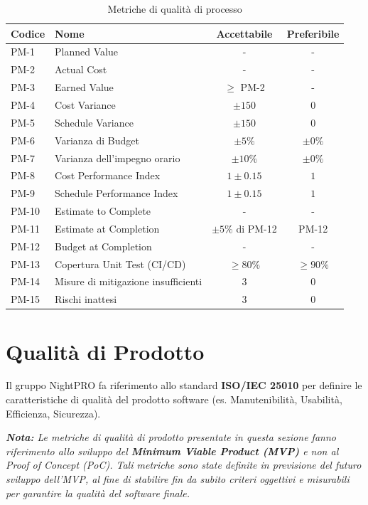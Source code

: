 \documentclass[a4paper,11pt,oneside]{scrartcl}
\begin{document}
\begin{table}[H]
\centering
\renewcommand{\arraystretch}{1.3}
\begin{tabularx}{\textwidth}{@{}p{}Xcc@{}}
\toprule
\textbf{Codice} & \textbf{Nome} & \textbf{Accettabile} & \textbf{Preferibile} \\
\midrule
PM-1 & Planned Value & - & - \\
PM-2 & Actual Cost & - & - \\
PM-3 & Earned Value & $\geq$ PM-2 & - \\
PM-4 & Cost Variance & $\pm 150$ & $0$ \\
PM-5 & Schedule Variance & $\pm 150$ & $0$ \\
PM-6 & Varianza di Budget & $\pm 5\%$ & $\pm 0\%$ \\
PM-7 & Varianza dell'impegno orario & $\pm 10\%$ & $\pm 0\%$ \\
PM-8 & Cost Performance Index & $1 \pm 0.15$ & $1$ \\
PM-9 & Schedule Performance Index & $1 \pm 0.15$ & $1$ \\
PM-10 & Estimate to Complete & - & - \\
PM-11 & Estimate at Completion & $\pm 5\%$ di PM-12 & PM-12 \\
PM-12 & Budget at Completion & - & - \\
PM-13 & Copertura Unit Test (CI/CD) & $\ge 80\%$ & $\ge 90\%$ \\
PM-14 & Misure di mitigazione insufficienti & $3$ & $0$ \\
PM-15 & Rischi inattesi & $3$ & $0$ \\
\bottomrule
\end{tabularx}
\caption{Metriche di qualità di processo}
\end{table}

\newpage


\section{Qualità di Prodotto}

Il gruppo NightPRO fa riferimento allo standard \textbf{ISO/IEC 25010}{\scriptsize{}} per definire le caratteristiche di qualità del prodotto software (es. Manutenibilità, Usabilità, Efficienza, Sicurezza).

\vspace{0.3cm}
\noindent\textit{\textbf{Nota:} Le metriche di qualità di prodotto presentate in questa sezione fanno riferimento allo sviluppo del \textbf{Minimum Viable Product (MVP)}{\scriptsize{}} e non al Proof of Concept (PoC){\scriptsize{}}. Tali metriche sono state definite in previsione del futuro sviluppo dell'MVP, al fine di stabilire fin da subito criteri oggettivi e misurabili per garantire la qualità del software finale.}
\vspace{0.3cm}
\end{document}
